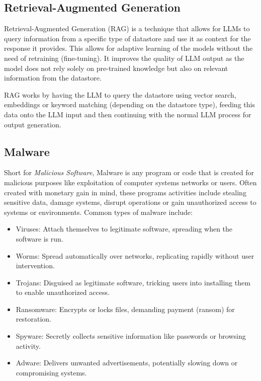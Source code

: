 \subsection{Retrieval-Augmented Generation}
Retrieval-Augmented Generation (RAG) is a technique that allows for LLMs to query information from
a specific type of datastore and use it as context for the response it provides. This allows for
adaptive learning of the models without the need of retraining (fine-tuning). It improves the
quality of LLM output as the model does not rely solely on pre-trained knowledge but also on
relevant information from the datastore.

RAG works by having the LLM to query the datastore using vector search, embeddings or keyword
matching (depending on the datastore type), feeding this data onto the LLM input and then
continuing with the normal LLM process for output generation.

\subsection{Malware}
Short for \textit{Malicious Software}, Malware is any program or code that is created for malicious
purposes like exploitation of computer systems networks or users. Often created with monetary gain
in mind, these programs activities include stealing sensitive data, damage systems, disrupt
operations or gain unauthorized access to systems or environments. Common types of malware include:
\begin{itemize}
	\item Viruses: Attach themselves to legitimate software, spreading when the software is run.
	\item Worms: Spread automatically over networks, replicating rapidly without user intervention.
	\item Trojans: Disguised as legitimate software, tricking users into installing them to enable
	      unauthorized access.
	\item Ransomware: Encrypts or locks files, demanding payment (ransom) for restoration.
	\item Spyware: Secretly collects sensitive information like passwords or browsing activity.
	\item Adware: Delivers unwanted advertisements, potentially slowing down or compromising systems.
\end{itemize}

